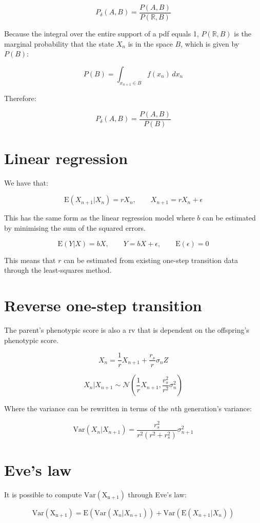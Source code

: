 \documentclass[a4paper,11pt]{article}
\begin{document}
$$P_{\delta}(A, B) = \frac{P(A, B)}{P(\mathbb{R}, B)}$$

Because the integral over the entire support of a pdf equals 1, $P(\mathbb{R}, B)$ is the marginal probability that the state $X_n$ is in the space $B$, which is given by $P(B)$:

$$P(B) = \int_{x_{n+1}\in B} f(x_n) \, dx_n$$



Therefore:

$$P_{\delta}(A, B) = \frac{P(A, B)}{P(B)}$$


\section{Linear regression}

We have that:

$$\mathrm{E}(X_{n+1}|X_n) = rX_n, \qquad X_{n+1} = rX_n + \epsilon$$

This has the same form as the linear regression model where $b$ can be estimated by minimising the sum of the squared errors.

$$\mathrm{E}(Y|X) = bX, \qquad Y = bX + \epsilon, \qquad \mathrm{E}(\epsilon) = 0 $$

This means that $r$ can be estimated from existing one-step transition data through the least-squares method. 


\section{Reverse one-step transition}
The parent's phenotypic score is also a rv that is dependent on the offspring's phenotypic score. 

$$X_n = \frac{1}{r}X_{n+1} + \frac{r_s}{r}\sigma_nZ$$


$$X_n|X_{n+1} \sim \mathcal{N}(\frac{1}{r}X_{n+1}, \frac{r_s^2}{r^2}\sigma_n^2)$$


Where the variance can be rewritten in terms of the $n$th generation's variance:

$$\mathrm{Var}(X_n|X_{n+1}) = \frac{r_s^2}{r^2(r^2+r_s^2)} \sigma_{n+1}^2$$

\section{Eve's law}
It is possible to compute $\mathrm{Var(X_{n+1})}$ through Eve's law:

$$\mathrm{Var(X_{n+1})} = \mathrm{E}(\mathrm{Var}(X_n|X_{n+1})) + \mathrm{Var}(\mathrm{E}(X_{n+1}|X_n))$$
\end{document}
